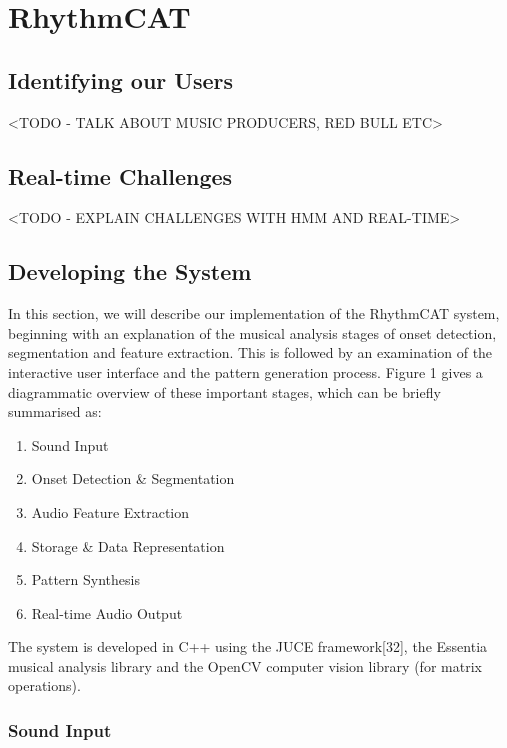 \section{RhythmCAT}

\subsection{Identifying our Users}

<TODO - TALK ABOUT MUSIC PRODUCERS, RED BULL ETC>

\subsection{Real-time Challenges}

<TODO - EXPLAIN CHALLENGES WITH HMM AND REAL-TIME>

\subsection{Developing the System}

In this section, we will describe our implementation of the RhythmCAT system, beginning with an explanation of the musical analysis stages of onset detection, segmentation and feature extraction. This is followed by an examination of the interactive user interface and the pattern generation process. Figure 1 gives a diagrammatic overview of these important stages, which can be briefly summarised as:

\begin{enumerate}
  \item Sound Input
  \item Onset Detection \& Segmentation
  \item Audio Feature Extraction
  \item Storage \& Data Representation
  \item Pattern Synthesis
  \item Real-time Audio Output
\end{enumerate}


The system is developed in C++ using the JUCE framework[32], the Essentia musical analysis library \citep{Bogdanov2013} and the OpenCV computer vision library \citep{Bradski2000} (for matrix operations).
 
\subsubsection{Sound Input}

